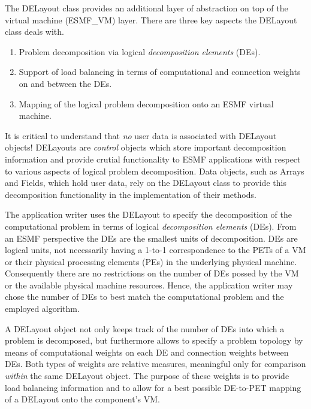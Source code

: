 
The DELayout class provides an additional layer of abstraction on top of the virtual machine (ESMF\_VM) layer. There are three key aspects the DELayout class deals with.

\begin{enumerate}

\item Problem decomposition via logical {\it decomposition elements} (DEs).

\item Support of load balancing in terms of computational and connection weights on and between the DEs. 

\item Mapping of the logical problem decomposition onto an ESMF virtual machine.

\end{enumerate}

It is critical to understand that {\it no} user data is associated with DELayout objects! DELayouts are {\it control} objects which store important decomposition information and provide crutial functionality to ESMF applications with respect to various aspects of logical problem decomposition. Data objects, such as Arrays and Fields, which hold user data, rely on the DELayout class to provide this decomposition functionality in the implementation of their methods.

The application writer uses the DELayout to specify the decomposition of the computational problem in terms of logical {\it decomposition elements} (DEs). From an ESMF perspective the DEs are the smallest units of decomposition. DEs are logical units, not necessarily having a 1-to-1 correspondence to the PETs of a VM or their physical processing elements (PEs) in the underlying physical machine. Consequently there are no restrictions on the number of DEs possed by the VM or the available physical machine resources. Hence, the application writer may chose the number of DEs to best match the computational problem and the employed algorithm.

A DELayout object not only keeps track of the number of DEs into which a problem is decomposed, but furthermore allows to specify a problem topology by means of computational weights on each DE and connection weights between DEs. Both types of weights are relative measures, meaningful only for comparison {\it within} the same DELayout object. The purpose of these weights is to provide load balancing information and to allow for a best possible DE-to-PET mapping of a DELayout onto the component's VM.

